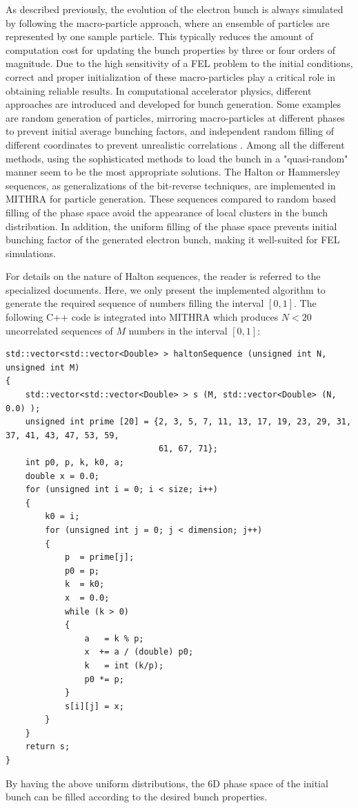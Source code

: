 As described previously, the evolution of the electron bunch is always simulated by following the macro-particle approach, where an ensemble of particles are represented by one sample particle.
%
This typically reduces the amount of computation cost for updating the bunch properties by three or four orders of magnitude.
%
Due to the high sensitivity of a FEL problem to the initial conditions, correct and proper initialization of these macro-particles play a critical role in obtaining reliable results.
%
In computational accelerator physics, different approaches are introduced and developed for bunch generation.
%
Some examples are random generation of particles, mirroring macro-particles at different phases to prevent initial average bunching factors, and independent random filling of different coordinates to prevent unrealistic correlations \cite{reiche2000numerical}.
%
Among all the different methods, using the sophisticated methods to load the bunch in a "quasi-random" manner seem to be the most appropriate solutions.
%
The Halton or Hammersley sequences, as generalizations of the bit-reverse techniques, are implemented in MITHRA for particle generation.
%
These sequences compared to random based filling of the phase space avoid the appearance of local clusters in the bunch distribution.
%
In addition, the uniform filling of the phase space prevents initial bunching factor of the generated electron bunch, making it well-suited for FEL simulations.

For details on the nature of Halton sequences, the reader is referred to the specialized documents.
%
Here, we only present the implemented algorithm to generate the required sequence of numbers filling the interval $[0,1]$.
%
The following C++ code is integrated into MITHRA which produces $N<20$ uncorrelated sequences of $M$ numbers in the interval $[0,1]$:
%
\begin{Verbatim}[frame=single, fontsize=\small, tabsize=4]
std::vector<std::vector<Double> > haltonSequence (unsigned int N, unsigned int M)
{
	std::vector<std::vector<Double> > s (M, std::vector<Double> (N, 0.0) );
	unsigned int prime [20] = {2, 3, 5, 7, 11, 13, 17, 19, 23, 29, 31, 37, 41, 43, 47, 53, 59,
	                           61, 67, 71};
	int p0, p, k, k0, a;
	double x = 0.0;
	for (unsigned int i = 0; i < size; i++)
	{
		k0 = i;
		for (unsigned int j = 0; j < dimension; j++)
		{
			p  = prime[j];
			p0 = p;
			k  = k0;
			x  = 0.0;
			while (k > 0)
			{
				a   = k % p;
				x  += a / (double) p0;
				k   = int (k/p);
				p0 *= p;
			}
			s[i][j] = x;
		}
	}
	return s;
}
\end{Verbatim}
%
By having the above uniform distributions, the 6D phase space of the initial bunch can be filled according to the desired bunch properties.

